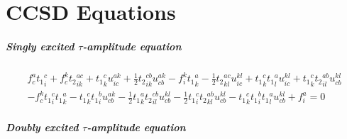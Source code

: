 \chapter{CCSD Equations}
\label{app:ccsd_equations}

\paragraph{Singly excited $\tau$-amplitude equation}

\begin{gather*}
f^{a}_{c} {t_1}^{c}_{i} 
+ f^{k}_{c} {t_2}^{ac}_{ik} 
+ {t_1}^{c}_{k} u^{ak}_{ic}
+ \frac{1}{2}{t_2}^{cb}_{ik} u^{ak}_{cb} 
- f^{k}_{i} {t_1}^{a}_{k}
- \frac{1}{2}{t_2}^{ac}_{kl} u^{kl}_{ic}
+ {t_1}^{c}_{k} {t_1}^{a}_{l} u^{kl}_{ic} 
 + {t_1}^{c}_{k} {t_2}^{ab}_{il} u^{kl}_{cb} \\
- f^{k}_{c} {t_1}^{c}_{i} {t_1}^{a}_{k}
- {t_1}^{c}_{k} {t_1}^{b}_{i} u^{ak}_{cb}
- \frac{1}{2}{t_1}^{a}_{k} {t_2}^{cb}_{il} u^{kl}_{cb}
- \frac{1}{2}{t_1}^{c}_{i} {t_2}^{ab}_{kl} u^{kl}_{cb}
- {t_1}^{c}_{k} {t_1}^{b}_{i} {t_1}^{a}_{l} u^{kl}_{cb}
+ f^{a}_{i}
= 0
\end{gather*}

\paragraph{Doubly excited $\tau$-amplitude equation}

